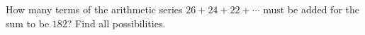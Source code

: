 How many terms of the arithmetic series $26+24+22+\cdots$ must be added for the sum to be $182$? Find all possibilities.
